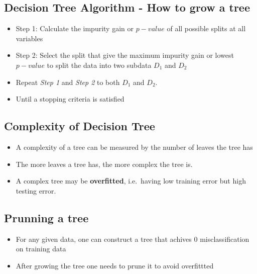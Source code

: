 \documentclass[
]{article}
\providecommand{\tightlist}{%
  \setlength{\itemsep}{0pt}\setlength{\parskip}{0pt}}
\begin{document}
\hypertarget{decision-tree-algorithm---how-to-grow-a-tree}{%
\subsection{Decision Tree Algorithm - How to grow a
tree}\label{decision-tree-algorithm---how-to-grow-a-tree}}

\begin{itemize}
\tightlist
\item
  Step 1: Calculate the impurity gain or \(p-value\) of all possible
  splits at all variables
\item
  Step 2: Select the split that give the maximum impurity gain or lowest
  \(p-value\) to split the data into two subdata \(D_1\) and \(D_2\)
\item
  Repeat \emph{Step 1} and \emph{Step 2} to both \(D_1\) and \(D_2\).
\item
  Until a stopping criteria is satisfied
\end{itemize}

\hypertarget{complexity-of-decision-tree}{%
\subsection{Complexity of Decision
Tree}\label{complexity-of-decision-tree}}

\begin{itemize}
\tightlist
\item
  A complexity of a tree can be measured by the number of leaves the
  tree has
\item
  The more leaves a tree has, the more complex the tree is.
\item
  A complex tree may be \textbf{overfitted}, i.e.~having low training
  error but high testing error.
\end{itemize}

\hypertarget{prunning-a-tree}{%
\subsection{Prunning a tree}\label{prunning-a-tree}}

\begin{itemize}
\tightlist
\item
  For any given data, one can construct a tree that achives 0
  misclassification on training data
\item
  After growing the tree one needs to prune it to avoid overfittted
\end{itemize}
\end{document}
